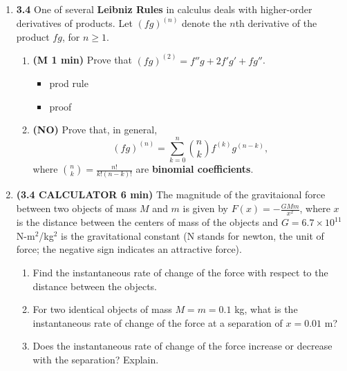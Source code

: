 \documentclass[12pt]{article}
\begin{document}
\begin{enumerate}[1.]
\newpage
\item {\bf 3.4} One of several \textbf{Leibniz Rules} in calculus deals with higher-order derivatives of products.  Let $(fg)^{(n)}$ denote the $n$th derivative of the product $fg$, for $n\geq 1$.
\begin{enumerate}
	\item {\bf (M 1 min)} Prove that $(fg)^{(2)}=f''g+2f'g'+fg''$.
	{\bf\begin{itemize}
\item prod rule
\item proof
\end{itemize}}
	\item {\bf (NO)} Prove that, in general, 
	\[
	(fg)^{(n)}=\sum_{k=0}^n\binom{n}{k}f^{(k)}g^{(n-k)},
	\]
	where $\binom{n}{k}=\frac{n!}{k!(n-k)!}$ are \textbf{binomial coefficients}.
	
\end{enumerate}

\item {\bf (3.4 CALCULATOR 6 min)} The magnitude of the gravitaional force between two objects of mass $M$ and $m$ is given by $F(x)=-\frac{GMm}{x^2}$, where $x$ is the distance between the centers of mass of the objects and $G=6.7\times 10^{11}$ N-m$^\text{2}$/kg$^\text{2}$ is the gravitational constant (N stands for newton, the unit of force; the negative sign indicates an attractive force).
\begin{enumerate}
	\item Find the instantaneous rate of change of the force with respect to the distance between the objects.
	
	\item For two identical objects of mass $M=m=0.1$ kg, what is the instantaneous rate of change of the force at a separation of $x=0.01$ m?
	
	\item Does the instantaneous rate of change of the force increase or decrease with the separation?  Explain.
\end{enumerate}


\end{enumerate}
\end{document}
